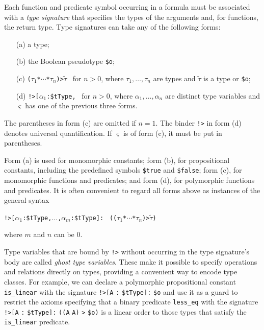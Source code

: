 Each function and predicate symbol occurring in a formula must be associated
with a {\em type signature\/} that specifies the types of the arguments and, for
functions, the return type. Type signatures can take any of the following forms:
%
\begin{enumerate}
\item[(a)] a type;
\item[(b)] the Boolean pseudotype {\tt \$o}; %
\pagebreak[2] %
\item[(c)] {\tt ($\tau_1$\;*\;${\cdots}$\;*\;$\tau_n$)\;>\;$\tilde \tau$}
\ for $n > 0$, where $\tau_1,\dots,\tau_n$ are types and $\tilde \tau$ is
a type or {\tt \$o};
\item[(d)] {\tt !>[$\alpha_1$\;:\;\$tType,}\;{\tt ${\dots}$,}\;{\tt
$\alpha_n$\;:\;\$tType]:\;$\varsigma$}
\ for $n > 0$, where $\alpha_1,\dots,\alpha_n$ are distinct
type variables and $\varsigma$ has one of the previous three forms.
\end{enumerate}
%
The parentheses in form (c) are omitted if $n = 1$.
The binder {\tt !>} in form (d) denotes universal quantification.
If $\varsigma$ is of form (c), it must be put in parentheses.

Form (a) is used for monomorphic constants; form (b), for
propositional constants, including the predefined symbols {\tt \$true} and
{\tt \$false}; form (c), for monomorphic functions and predicates;
and form (d), for polymorphic functions and predicates. It is often
convenient to regard all forms above as instances of the general syntax
\begin{center}
{\tt !>[$\alpha_1$\;:\;\$tType,\;${\dots}$,\;$\alpha_m$\;:\;\$tType]:} {\tt
(($\tau_1$\;*\;${\cdots}$\;*\;$\tau_n$)\;>\;$\tilde \tau$)}
\end{center}
where $m$ and $n$ can be 0. %

Type variables that are bound by {\tt !>} without
occurring in the type signature's body are called \emph{ghost type variables}.
These make it possible to specify operations and relations directly on types,
providing a convenient way to encode type classes.
For example, we can declare a polymorphic propositional
constant {\tt is\_linear} with the signature
{\tt !>[A} {\tt :} {\tt \$tType]:} {\tt \$o} and use it as a guard to restrict the
axioms specifying that a binary predicate {\tt less\_eq} with the signature
{\tt !>[A} {\tt :} {\tt \$tType]:} {\tt ((A} {\tt *} {\tt A)} {\tt >} {\tt \$o)}
is a linear order to those types that satisfy the {\tt is\_linear} predicate.

